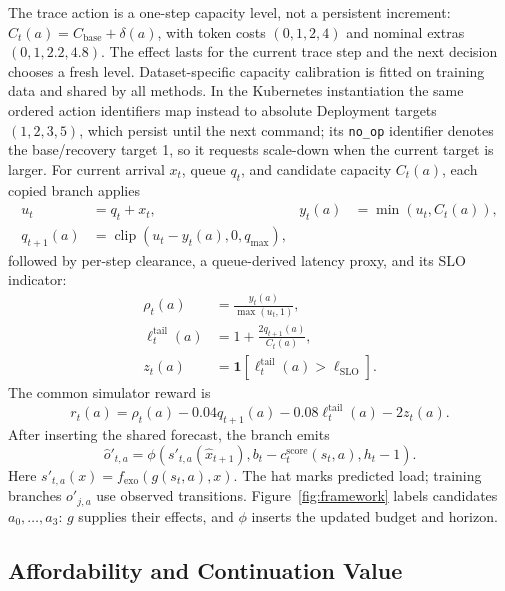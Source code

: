 \documentclass[acmsmall,screen,review,anonymous]{acmart}
\begin{document}
The trace action is a one-step capacity level, not a persistent increment:
\(C_t(a)=C_{\mathrm{base}}+\delta(a)\), with token costs
\((0,1,2,4)\) and nominal extras \((0,1,2.2,4.8)\).  The effect lasts for the
current trace step and the next decision chooses a fresh level.  Dataset-specific
capacity calibration is fitted on training data and shared by all methods.  In
the Kubernetes instantiation the same ordered action identifiers map instead
to absolute Deployment targets \((1,2,3,5)\), which persist until the next
command; its \texttt{no\_op} identifier denotes the base/recovery target
1, so it requests scale-down when the current target is larger.  For current arrival \(x_t\),
queue \(q_t\), and candidate capacity \(C_t(a)\), each copied branch applies
\begin{align}
  u_t &= q_t+x_t, & y_t(a)&=\min(u_t,C_t(a)),\\
  q_{t+1}(a)&=\operatorname{clip}(u_t-y_t(a),0,q_{\max}),
\end{align}
followed by per-step clearance, a queue-derived latency proxy, and its SLO indicator:
\begin{align}
  \rho_t(a)&=\frac{y_t(a)}{\max(u_t,1)},\\
  \ell_t^{\mathrm{tail}}(a)&=1+\frac{2q_{t+1}(a)}{C_t(a)},\\
  z_t(a)&=\mathbf 1[\ell_t^{\mathrm{tail}}(a)>\ell_{\mathrm{SLO}}].
\end{align}
The common simulator reward is
\begin{equation}
  r_t(a)=\rho_t(a)-0.04q_{t+1}(a)
  -0.08\ell_t^{\mathrm{tail}}(a)-2z_t(a).
\end{equation}
After inserting the shared forecast, the branch emits
\begin{equation}
  \widehat o'_{t,a}=\phi(s'_{t,a}(\widehat x_{t+1}),
  b_t-c_t^{\mathrm{score}}(s_t,a),h_t-1).
\end{equation}
Here \(s'_{t,a}(x)=f_{\mathrm{exo}}(g(s_t,a),x)\). The hat marks predicted
load; training branches \(o'_{j,a}\) use observed transitions.
Figure~\ref{fig:framework} labels candidates \(a_0,\ldots,a_3\):
\(g\) supplies their effects, and \(\phi\) inserts the updated budget and horizon.

\subsection{Affordability and Continuation Value}
\end{document}
